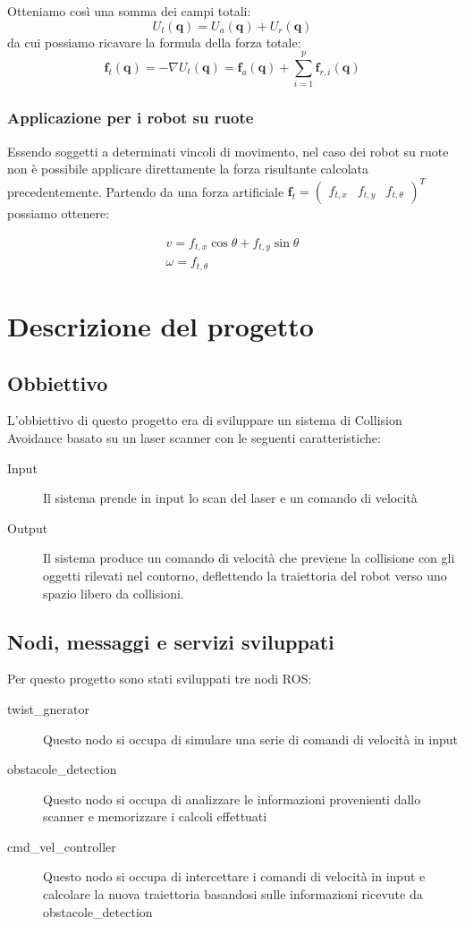 \documentclass[Lau, binding=0.6cm, oneside]{sapthesis}
\begin{document}
Otteniamo così una somma dei campi totali:
$$
U_{t}(\boldsymbol{q})=U_{a}(\boldsymbol{q})+U_{r}(\boldsymbol{q})
$$
da cui possiamo ricavare la formula della forza totale:
$$
\boldsymbol{f}_{t}(\boldsymbol{q})=-\nabla U_{t}(\boldsymbol{q})=\boldsymbol{f}_{a}(\boldsymbol{q})+\sum_{i=1}^{p} \boldsymbol{f}_{r, i}(\boldsymbol{q})
$$

\subsection{Applicazione per i robot su ruote}
Essendo soggetti a determinati vincoli di movimento, nel caso dei robot su ruote non è possibile applicare direttamente la forza risultante calcolata precedentemente.
Partendo da una forza artificiale $\boldsymbol{f}_{t}=\left(\begin{array}{lll}f_{t, x} & f_{t, y} & f_{t, \theta}\end{array}\right)^{T}$ possiamo ottenere:

$$
\begin{array}{l}
v=f_{t, x} \cos \theta+f_{t, y} \sin \theta \\
\omega=f_{t, \theta}
\end{array}
$$

\cite{fonte2}

\chapter{Descrizione del progetto}
\section{Obbiettivo}
L'obbiettivo di questo progetto era di sviluppare un sistema di Collision Avoidance basato su un laser scanner con le seguenti caratteristiche:
\begin{description}
	\item[Input] Il sistema prende in input lo scan del laser e un comando di velocità
	\item[Output] Il sistema produce un comando di velocità che previene la collisione con gli oggetti rilevati nel contorno, deflettendo la traiettoria del robot verso uno spazio libero da collisioni.
\end{description}

\section{Nodi, messaggi e servizi sviluppati}
Per questo progetto sono stati sviluppati tre nodi ROS:
\begin{description}
	\item[twist\_gnerator] Questo nodo si occupa di simulare una serie di comandi di velocità in input
	\item[obstacole\_detection] Questo nodo si occupa di analizzare le informazioni provenienti dallo scanner e memorizzare i calcoli effettuati
	\item[cmd\_vel\_controller] Questo nodo si occupa di intercettare i comandi di velocità in input e calcolare la nuova traiettoria basandosi sulle informazioni ricevute da obstacole\_detection
\end{description}
\end{document}
